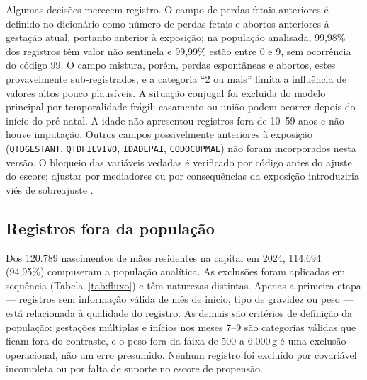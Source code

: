 \documentclass[11pt,a4paper]{article}
\newcommand{\campo}[1]{\texttt{#1}}       %
\begin{document}
Algumas decisões merecem registro. O campo de perdas fetais anteriores é definido no
dicionário como número de perdas fetais e abortos anteriores à gestação atual, portanto
anterior à exposição; na população analisada, 99,98\% dos registros têm valor não
sentinela e 99,99\% estão entre 0 e 9, sem ocorrência do código 99. O campo mistura,
porém, perdas espontâneas e abortos, estes provavelmente sub-registrados, e a categoria
``2 ou mais'' limita a influência de valores altos pouco plausíveis. A situação conjugal
foi excluída do modelo principal por temporalidade frágil: casamento ou união podem
ocorrer depois do início do pré-natal. A idade não apresentou registros fora de 10--59
anos e não houve imputação. Outros campos possivelmente anteriores à exposição
(\campo{QTDGESTANT}, \campo{QTDFILVIVO}, \campo{IDADEPAI}, \campo{CODOCUPMAE}) não foram
incorporados nesta versão. O bloqueio das variáveis vedadas é verificado por código antes
do ajuste do escore; ajustar por mediadores ou por consequências da exposição introduziria
viés de sobreajuste \cite{schisterman2009}.

\subsection{Registros fora da população}

Dos 120.789 nascimentos de mães residentes na capital em 2024, 114.694 (94,95\%)
compuseram a população analítica. As exclusões foram aplicadas em sequência
(Tabela~\ref{tab:fluxo}) e têm naturezas distintas. Apenas a primeira etapa --- registros
sem informação válida de mês de início, tipo de gravidez ou peso --- está relacionada à
qualidade do registro. As demais são critérios de definição da população: gestações
múltiplas e inícios nos meses 7--9 são categorias válidas que ficam fora do contraste, e
o peso fora da faixa de 500 a 6.000\,g é uma exclusão operacional, não um erro presumido.
Nenhum registro foi excluído por covariável incompleta ou por falta de suporte no escore
de propensão.
\end{document}

